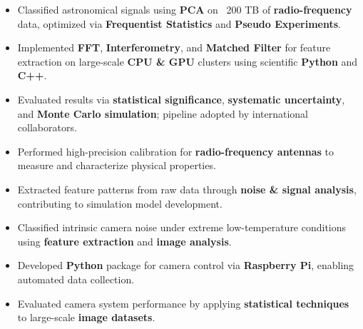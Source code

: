 \documentclass[10pt,a4paper,ragged2e,withhyper]{altacv}
\begin{document}

\begin{itemize}
\item Classified astronomical signals using {\bf PCA} on ~200 TB of {\bf radio-frequency} data, optimized via {\bf Frequentist Statistics} and {\bf Pseudo Experiments}.
\item Implemented {\bf FFT}, {\bf Interferometry}, and {\bf Matched Filter} for feature extraction on large-scale {\bf CPU \& GPU} clusters using scientific {\bf Python} and {\bf C++}.
\item Evaluated results via {\bf statistical significance}, {\bf systematic uncertainty}, and {\bf Monte Carlo simulation}; pipeline adopted by international collaborators.
\end{itemize}
\begin{itemize}
\item Performed high-precision calibration for {\bf radio-frequency antennas} to measure and characterize physical properties.
\item Extracted feature patterns from raw data through {\bf noise \& signal analysis}, contributing to simulation model development.
\end{itemize}
\divider

\begin{itemize}
\item Classified intrinsic camera noise under extreme low-temperature conditions using {\bf feature extraction} and {\bf image analysis}.
\item Developed {\bf Python} package for camera control via {\bf Raspberry Pi}, enabling automated data collection.
\item Evaluated camera system performance by applying {\bf statistical techniques} to large-scale {\bf image datasets}.
\end{itemize}
\end{document}
